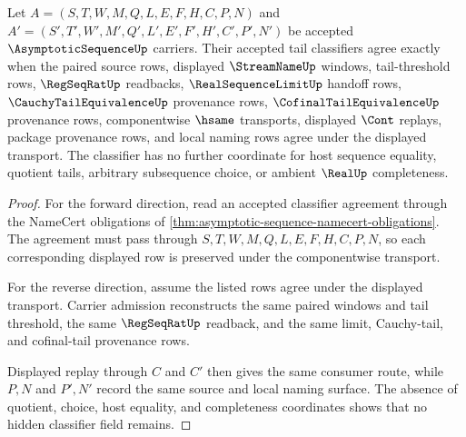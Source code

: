 \begin{theorem}
\label{thm:asymptotic-sequence-tail-classifier}
Let $A=(S,T,W,M,Q,L,E,F,H,C,P,N)$ and $A'=(S',T',W',M',Q',L',E',F',H',C',P',N')$ be accepted $\AsymptoticSequenceUp$ carriers. Their accepted tail classifiers agree exactly when the paired source rows, displayed $\StreamNameUp$ windows, tail-threshold rows, $\RegSeqRatUp$ readbacks, $\RealSequenceLimitUp$ handoff rows, $\CauchyTailEquivalenceUp$ provenance rows, $\CofinalTailEquivalenceUp$ provenance rows, componentwise $\hsame$ transports, displayed $\Cont$ replays, package provenance rows, and local naming rows agree under the displayed transport. The classifier has no further coordinate for host sequence equality, quotient tails, arbitrary subsequence choice, or ambient $\RealUp$ completeness.
\end{theorem}
\begin{proof}
For the forward direction, read an accepted classifier agreement through the NameCert obligations of \autoref{thm:asymptotic-sequence-namecert-obligations}. The agreement must pass through $S,T,W,M,Q,L,E,F,H,C,P,N$, so each corresponding displayed row is preserved under the componentwise transport.

For the reverse direction, assume the listed rows agree under the displayed transport. Carrier admission reconstructs the same paired windows and tail threshold, the same $\RegSeqRatUp$ readback, and the same limit, Cauchy-tail, and cofinal-tail provenance rows.

Displayed replay through $C$ and $C'$ then gives the same consumer route, while $P,N$ and $P',N'$ record the same source and local naming surface. The absence of quotient, choice, host equality, and completeness coordinates shows that no hidden classifier field remains.
\end{proof}



